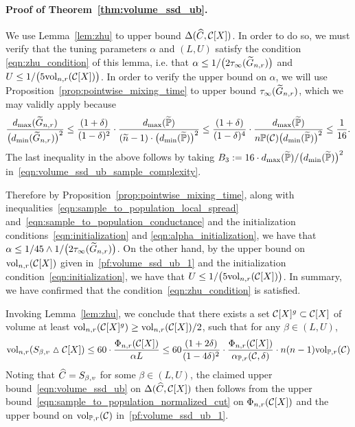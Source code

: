 \paragraph{Proof of Theorem~\ref{thm:volume_ssd_ub}.}
We use Lemma~\ref{lem:zhu} to upper bound $\Delta(\widehat{C},\mathcal{C}[X])$. In order to do so, we must verify that the tuning parameters $\alpha$ and $(L,U)$ satisfy the condition \eqref{eqn:zhu_condition} of this lemma, i.e. that $\alpha \leq 1/\bigl(2\tau_{\infty}(\widetilde{G}_{n,r})\bigr)$ and $U \leq 1/\bigl(5 \mathrm{vol}_{n,r}(\mathcal{C}[X])\bigr)$. In order to verify the upper bound on $\alpha$, we will use Proposition~\ref{prop:pointwise_mixing_time} to upper bound $\tau_{\infty}(\widetilde{G}_{n,r})$, which we may validly apply because
\begin{equation*}
\frac{d_{\max}(\widetilde{G}_{n,r})}{\bigl(d_{\min}(\widetilde{G}_{n,r})\bigr)^2} \leq \frac{(1 + \delta)}{(1 - \delta)^2} \cdot \frac{d_{\max}(\widetilde{\mathbb{P}})}{(\widetilde{n} - 1) \cdot \bigl(d_{\min}(\widetilde{\mathbb{P}})\bigr)^2} \leq \frac{(1 + \delta)}{(1 - \delta)^4} \cdot \frac{d_{\max}(\widetilde{\mathbb{P}})}{n\mathbb{P}(\mathcal{C})\bigl(d_{\min}(\widetilde{\mathbb{P}})\bigr)^2} \leq \frac{1}{16}.
\end{equation*}
The last inequality in the above follows by taking $B_3 := 16 \cdot d_{\max}(\widetilde{\mathbb{P}})/\bigl(d_{\min}(\widetilde{\mathbb{P}})\bigr)^2$ in~\eqref{eqn:volume_ssd_ub_sample_complexity}.

Therefore by Proposition~\ref{prop:pointwise_mixing_time}, along with inequalities~\eqref{eqn:sample_to_population_local_spread} and~\eqref{eqn:sample_to_population_conductance} and the initialization conditions~\eqref{eqn:initialization} and \eqref{eqn:alpha_initialization}, we have that $\alpha \leq 1/45 \wedge 1/\bigl(2\tau_{\infty}(\widetilde{G}_{n,r})\bigr)$.  
On the other hand, by the upper bound on $\mathrm{vol}_{n,r}(\mathcal{C}[X])$ given in~\eqref{pf:volume_ssd_ub_1} and the initialization condition~\eqref{eqn:initialization}, we have that $U \leq 1/\bigl(5 \mathrm{vol}_{n,r}(\mathcal{C}[X])\bigr)$. In summary, we have confirmed that the condition~\eqref{eqn:zhu_condition} is satisfied.

Invoking Lemma~\ref{lem:zhu}, we conclude that there exists a set $\mathcal{C}[X]^g \subset \mathcal{C}[X]$ of volume at least $\mathrm{vol}_{n,r}(\mathcal{C}[X]^g) \geq \mathrm{vol}_{n,r}(\mathcal{C}[X])/2$, such that for any $\beta \in (L,U)$,
\begin{equation*}
\mathrm{vol}_{n,r}(S_{\beta,v} \vartriangle \mathcal{C}[X]) \leq 60 \cdot \frac{\Phi_{n,r}(\mathcal{C}[X])}{\alpha L} \leq 60 \frac{(1 + 2\delta)}{(1 - 4\delta)^2} \cdot \frac{\Phi_{n,r}(\mathcal{C}[X])}{\alpha_{\mathbb{P},r}(\mathcal{C},\delta)}\cdot n(n-1)\mathrm{vol}_{\mathbb{P},r}(\mathcal{C})
\end{equation*}
Noting that $\widehat{C} = S_{\beta,v}$ for some $\beta \in (L,U)$, the claimed upper bound~\eqref{eqn:volume_ssd_ub} on $\Delta(\widehat{C},\mathcal{C}[X])$ then follows from the upper bound~\eqref{eqn:sample_to_population_normalized_cut} on $\Phi_{n,r}(\mathcal{C}[X])$ and the upper bound on $\mathrm{vol}_{\mathbb{P},r}(\mathcal{C})$ in~\eqref{pf:volume_ssd_ub_1}.

